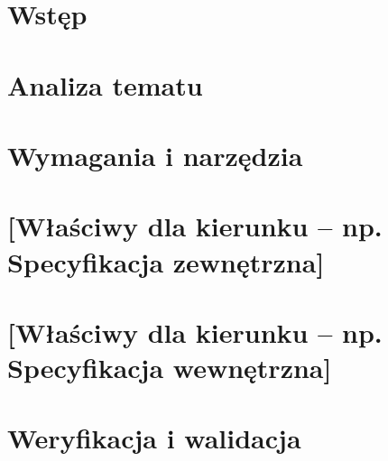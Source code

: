 \documentclass[a4paper,twoside,12pt]{book}
\begin{document}
\tableofcontents

\setcounter{stronyPozaNumeracja}{\value{page}}
\mainmatter
\pagestyle{empty}

\cleardoublepage

\pagestyle{NumeryStronNazwyRozdzialow}


\chapter{Wstęp}


\chapter{Analiza tematu}


\chapter{Wymagania i narzędzia}


\chapter{[Właściwy dla kierunku -- np. Specyfikacja zewnętrzna]}



\chapter{[Właściwy dla kierunku -- np. Specyfikacja wewnętrzna]}


\chapter{Weryfikacja i walidacja}

\end{document}
